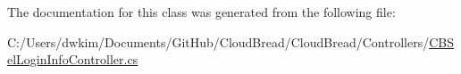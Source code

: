 The documentation for this class was generated from the following file\+:\begin{DoxyCompactItemize}
\item 
C\+:/\+Users/dwkim/\+Documents/\+Git\+Hub/\+Cloud\+Bread/\+Cloud\+Bread/\+Controllers/\hyperlink{_c_b_sel_login_info_controller_8cs}{C\+B\+Sel\+Login\+Info\+Controller.\+cs}\end{DoxyCompactItemize}

